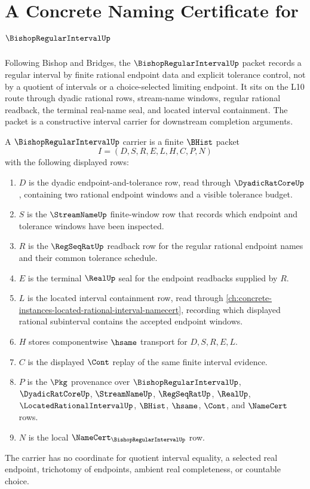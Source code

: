 \chapter{A Concrete Naming Certificate for $\BishopRegularIntervalUp$}
\label{ch:concrete-instances-bishop-regular-interval-namecert}

Following Bishop and Bridges, the $\BishopRegularIntervalUp$ packet records a regular interval by finite rational endpoint data and explicit tolerance control, not by a quotient of intervals or a choice-selected limiting endpoint. It sits on the L10 route through dyadic rational rows, stream-name windows, regular rational readback, the terminal real-name seal, and located interval containment. The packet is a constructive interval carrier for downstream completion arguments.

\begin{definition}
\label{def:bishop-regular-interval-carrier}
A $\BishopRegularIntervalUp$ carrier is a finite $\BHist$ packet
$$
I=(D,S,R,E,L,H,C,P,N)
$$
with the following displayed rows:
\begin{enumerate}
\item $D$ is the dyadic endpoint-and-tolerance row, read through $\DyadicRatCoreUp$, containing two rational endpoint windows and a visible tolerance budget.
\item $S$ is the $\StreamNameUp$ finite-window row that records which endpoint and tolerance windows have been inspected.
\item $R$ is the $\RegSeqRatUp$ readback row for the regular rational endpoint names and their common tolerance schedule.
\item $E$ is the terminal $\RealUp$ seal for the endpoint readbacks supplied by $R$.
\item $L$ is the located interval containment row, read through \autoref{ch:concrete-instances-located-rational-interval-namecert}, recording which displayed rational subinterval contains the accepted endpoint windows.
\item $H$ stores componentwise $\hsame$ transport for $D,S,R,E,L$.
\item $C$ is the displayed $\Cont$ replay of the same finite interval evidence.
\item $P$ is the $\Pkg$ provenance over $\BishopRegularIntervalUp$, $\DyadicRatCoreUp$, $\StreamNameUp$, $\RegSeqRatUp$, $\RealUp$, $\LocatedRationalIntervalUp$, $\BHist$, $\hsame$, $\Cont$, and $\NameCert$ rows.
\item $N$ is the local $\NameCert_{\BishopRegularIntervalUp}$ row.
\end{enumerate}
The carrier has no coordinate for quotient interval equality, a selected real endpoint, trichotomy of endpoints, ambient real completeness, or countable choice.
\end{definition}

